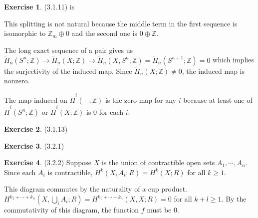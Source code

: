 \documentclass[12pt, psamsfonts]{amsart}
\theoremstyle{definition}
\newtheorem*{exer}{Exercise}
\theoremstyle{remark}
\numberwithin{equation}{section}
\begin{document}
\begin{exer}{(3.1.11)}
  is

  \begin{center}
  \end{center}

  This splitting is not natural because the middle term in the first sequence is isomorphic to $\mathbb{Z}_m \oplus 0$ and the second one is $0 \oplus \mathbb{Z}$.


  The long exact sequence of a pair gives us $\tilde{H}_n(S^n; \mathbb{Z}) \rightarrow \tilde{H}_n(X; \mathbb{Z}) \rightarrow \tilde{H}_n(X, S^n; \mathbb{Z}) = \tilde{H}_n(S^{n + 1}; \mathbb{Z}) = 0$ which implies the surjectivity of the induced map.
  Since $\tilde{H}_n(X; \mathbb{Z}) \ne 0$, the induced map is nonzero.

  The map induced on $\tilde{H}^i(-;\mathbb{Z})$ is the zero map for any $i$ because at least one of $\tilde{H}^i(S^n; \mathbb{Z})$ or $\tilde{H}^i(X; \mathbb{Z})$ is 0 for each $i$.
\end{exer}

\begin{exer}{(3.1.13)}
\end{exer}

\begin{exer}{(3.2.1)}
\end{exer}

\begin{exer}{(3.2.2)}
  Suppose $X$ is the union of contractible open sets $A_1, \cdots, A_n$.
  Since each $A_i$ is contractible, $H^k(X, A_i; R) = H^k(X; R)$ for all $k \geq 1$.

  \begin{center}
  \end{center}

  This diagram commutes by the naturality of a cup product.
  $H^{k_1 + \cdots + k_n}(X, \bigcup_i A_i; R) = H^{k_1 + \cdots + k_n}(X, X; R) = 0$ for all $k + l \ge 1$.
  By the commutativity of this diagram, the function $f$ must be 0.
\end{exer}
\end{document}
